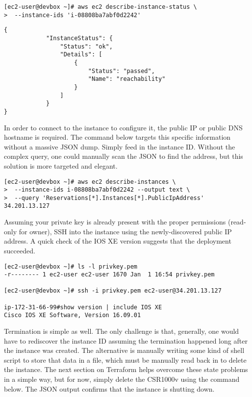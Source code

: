 \begin{verbatim}
[ec2-user@devbox ~]# aws ec2 describe-instance-status \
>  --instance-ids 'i-08808ba7abf0d2242'
\end{verbatim}

\begin{verbatim}
{
            "InstanceStatus": {
                "Status": "ok", 
                "Details": [
                    {
                        "Status": "passed", 
                        "Name": "reachability"
                    }
			    ]
            }
}
\end{verbatim}

In order to connect to the instance to configure it, the public IP or public
DNS hostname is required. The command below targets this specific information
without a massive JSON dump. Simply feed in the instance ID\@. Without the
complex query, one could manually scan the JSON to find the address, but this
solution is more targeted and elegant.

\begin{verbatim}
[ec2-user@devbox ~]# aws ec2 describe-instances \
>  --instance-ids i-08808ba7abf0d2242 --output text \
>  --query 'Reservations[*].Instances[*].PublicIpAddress' 
34.201.13.127
\end{verbatim}

Assuming your private key is already present with the proper permissions
(read-only for owner), SSH into the instance using the newly-discovered public
IP address. A quick check of the IOS XE version suggests that the deployment
succeeded.

\begin{verbatim}
[ec2-user@devbox ~]# ls -l privkey.pem 
-r-------- 1 ec2-user ec2-user 1670 Jan  1 16:54 privkey.pem

[ec2-user@devbox ~]# ssh -i privkey.pem ec2-user@34.201.13.127

ip-172-31-66-99#show version | include IOS XE
Cisco IOS XE Software, Version 16.09.01
\end{verbatim}

Termination is simple as well. The only challenge is that, generally, one
would have to rediscover the instance ID assuming the termination happened
long after the instance was created. The alternative is manually writing some
kind of shell script to store that data in a file, which must be manually read
back in to delete the instance. The next section on Terraform helps overcome
these state problems in a simple way, but for now, simply delete the CSR1000v
using the command below. The JSON output confirms that the instance is
shutting down.

